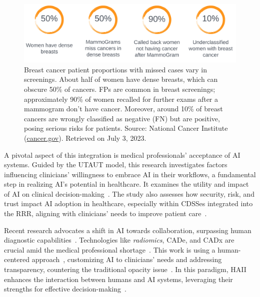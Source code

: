\begin{figure}[ht]
\centering
\includegraphics[width=\textwidth]{images/fig114}
\caption{\textcolor{revised}{Breast cancer patient proportions with missed cases vary in screenings. About half of women have dense breasts, which can obscure 50\% of cancers. FPs are common in breast screenings; approximately 90\% of women recalled for further exams after a mammogram don't have cancer. Moreover, around 10\% of breast cancers are wrongly classified as negative (FN) but are positive, posing serious risks for patients. Source: National Cancer Institute (\href{https://www.cancer.gov/types/breast/mammograms-fact-sheet}{cancer.gov}). Retrieved on July 3, 2023.}}
\label{fig:fig114}
\end{figure}

\textcolor{revised}{A pivotal aspect of this integration is medical professionals' acceptance of \ac{AI} systems.
Guided by the \ac{UTAUT}\cite{CALISTO2022102922, info:doi/10.2196/27122} model, this research investigates factors influencing clinicians' willingness to embrace \ac{AI} in their workflows, a fundamental step in realizing \ac{AI}'s potential in healthcare\cite{10.1001/jamainternmed.2015.5231, Houssami2017}.
It examines the utility and impact of \ac{AI} on clinical decision-making~\cite{9473208}.
The study also assesses how security, risk, and trust impact \ac{AI} adoption in healthcare, especially within \acp{CDSSe} integrated into the \ac{RRR}, aligning with clinicians' needs to improve patient care~\cite{10.1145/3544548.3581075, EVANS2022281}.}

\textcolor{revised}{Recent research advocates a shift in \ac{AI} towards collaboration, surpassing human diagnostic capabilities~\cite{Ribli2018, Topol2019}.
Technologies like {\it radiomics}, \ac{CADe}, and \ac{CADx} are crucial amid the medical professional shortage~\cite{McKinney2020}.
This work is using a human-centered approach~\cite{doi:10.1148/radiol.2019182627}, customizing \ac{AI} to clinicians' needs and addressing transparency, countering the traditional opacity issue~\cite{10.1145/3306618.3314293}.
In this paradigm, \ac{HAII} enhances the interaction between humans and \ac{AI} systems, leveraging their strengths for effective decision-making~\cite{10.1145/3313831.3376807, 10.1145/3313831.3376301}.}

